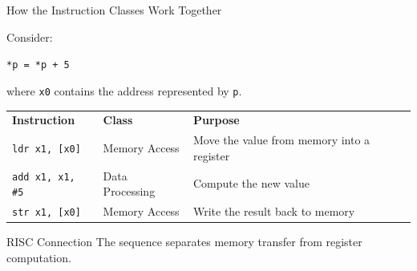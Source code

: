 \documentclass[aspectratio=169,11pt,t]{beamer}
\newcommand{\code}[1]{\texttt{#1}}
\begin{document}

\begin{frame}{How the Instruction Classes Work Together}

Consider:

\begin{center}
\large
\code{*p = *p + 5}
\end{center}

where \code{x0}
contains the address
represented by \code{p}.

\vspace{0.15cm}

\begin{center}

\small

\renewcommand{\arraystretch}{1.05}

\begin{tabular}{
  >{\raggedright\arraybackslash}m{3.3cm}
  >{\raggedright\arraybackslash}m{3.0cm}
  >{\raggedright\arraybackslash}m{5.0cm}
}

\rowcolor{navy}
{\color{white}\bfseries Instruction}
&
{\color{white}\bfseries Class}
&
{\color{white}\bfseries Purpose}
\\

\rowcolor{softgray}
\code{ldr x1, [x0]}
&
Memory Access
&
Move the value
from memory into a register
\\

\rowcolor{white}
\code{add x1, x1, \#5}
&
Data Processing
&
Compute the new value
\\

\rowcolor{softgray}
\code{str x1, [x0]}
&
Memory Access
&
Write the result
back to memory
\\

\end{tabular}

\end{center}

\vspace{0.15cm}

\begin{block}{RISC Connection}
The sequence separates
memory transfer
from register computation.
\end{block}

\end{frame}



\end{document}
